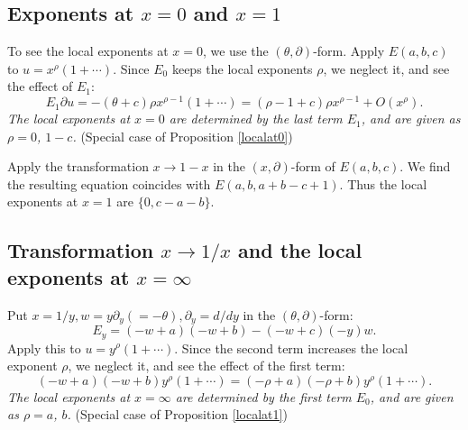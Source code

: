 \documentclass[a4paper,12pt]{article}
\theoremstyle{definition}
\theoremstyle{remark}
\numberwithin{equation}{section} %
\begin{document}
\subsection{Exponents at $x=0$ and $x=1$}\label{E2Ex}
To see the local exponents at $x=0$, we use the $(\theta,\partial)$-form.
Apply $E(a,b,c)$ to $u=x^\rho(1+\cdots)$.
Since $E_0$ keeps the local exponents $\rho$,
we neglect it, and see the effect of $E_1$:
  $$E_1\partial u=-(\theta+c)\rho x^{\rho-1}(1+\cdots)=(\rho-1+c)\rho x^{\rho-1}+O(x^{\rho}).$$
       {\sl The local exponents at $x=0$ are determined by the last term $E_1$,
         and are given as $\rho=0$, $1-c$.} (Special case of Proposition \ref{localat0})


   Apply the transformation $x\rightarrow 1-x$ in the $(x,\partial)$-form of $E(a,b,c)$. We find the resulting equation coincides with $E(a,b,a+b-c+1)$. Thus the local exponents at $x=1$ are $\{0,c-a-b\}$.

\subsection{Transformation $x\to1/x$ and the local exponents at $x=\infty$}\label{E20toinfty}
Put $x=1/y, w=y\partial_{y}(=-\theta), \partial_y=d/dy$ in the $(\theta,\partial)$-form:
\begin{equation}\label{Ey}E_y=(-w+a)(-w+b)-(-w+c)(-y)w.\end{equation}
Apply this to $u=y^\rho(1+\cdots)$. Since the second term increases the local exponent $\rho$, we neglect it, and see the effect of the first term:
$$(-w+a)(-w+b)y^\rho(1+\cdots)=(-\rho+a)(-\rho+b)y^\rho(1+\cdots).$$
{\sl The local exponents at $x=\infty$ are determined by the first term $E_0$, and are given as $\rho=a$, $b$.} (Special case of Proposition \ref{localat1}) 
\end{document}
